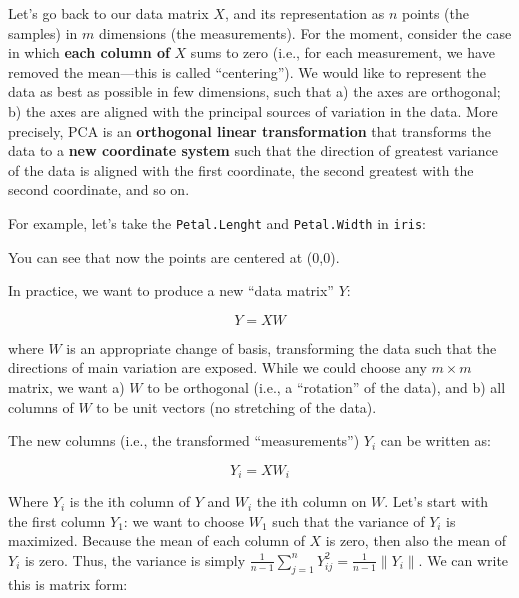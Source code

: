 \documentclass[
  letterpaper,
  DIV=11,
  numbers=noendperiod]{scrreprt}
\newenvironment{Shaded}{\begin{snugshade}}{\end{snugshade}}
\newcommand{\NormalTok}[1]{\textcolor[rgb]{0.00,0.23,0.31}{#1}}
\begin{document}
Let's go back to our data matrix \(X\), and its representation as \(n\)
points (the samples) in \(m\) dimensions (the measurements). For the
moment, consider the case in which \textbf{each column of} \(X\) sums to
zero (i.e., for each measurement, we have removed the mean---this is
called ``centering''). We would like to represent the data as best as
possible in few dimensions, such that a) the axes are orthogonal; b) the
axes are aligned with the principal sources of variation in the data.
More precisely, PCA is an \textbf{orthogonal linear transformation} that
transforms the data to a \textbf{new coordinate system} such that the
direction of greatest variance of the data is aligned with the first
coordinate, the second greatest with the second coordinate, and so on.

For example, let's take the \texttt{Petal.Lenght} and
\texttt{Petal.Width} in \texttt{iris}:

\begin{Shaded}
\end{Shaded}

You can see that now the points are centered at (0,0).

In practice, we want to produce a new ``data matrix'' \(Y\):

\[
Y = XW
\]

where \(W\) is an appropriate change of basis, transforming the data
such that the directions of main variation are exposed. While we could
choose any \(m \times m\) matrix, we want a) \(W\) to be orthogonal
(i.e., a ``rotation'' of the data), and b) all columns of \(W\) to be
unit vectors (no stretching of the data).

The new columns (i.e., the transformed ``measurements'') \(Y_i\) can be
written as:

\[
Y_{i} = X W_i
\]

Where \(Y_i\) is the ith column of \(Y\) and \(W_i\) the ith column on
\(W\). Let's start with the first column \(Y_1\): we want to choose
\(W_1\) such that the variance of \(Y_i\) is maximized. Because the mean
of each column of \(X\) is zero, then also the mean of \(Y_i\) is zero.
Thus, the variance is simply
\(\frac{1}{n-1}\sum_{j =1}^{n} Y_{ij}^2 =\frac{1}{n-1} \|Y_i\|\). We can
write this is matrix form:
\end{document}
